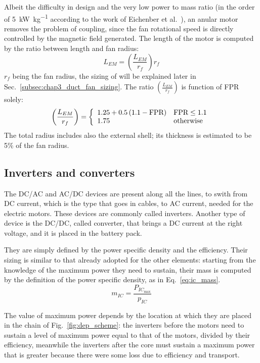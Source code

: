 Albeit the difficulty in design and the very low power to mass ratio (in the order of 5~\si{\kilo\watt\per\kilogram} according to the work of Eichenber et al.~\cite{bib:eichenber}), an anular motor removes the problem of coupling, since the fan rotational speed is directly controlled by the magnetic field generated. 
The length of the motor is computed by the ratio between length and fan radius:
\begin{equation}
	\label{eq:motor_length}
	L_{EM} = \left(\frac{L_{EM}}{r_{f}}\right)r_{f}
\end{equation}
$r_{f}$ being the fan radius, the sizing of will be explained later in Sec.~\ref{subsec:chap3_duct_fan_sizing}. 
The ratio $\left(\frac{L_{EM}}{r_{f}}\right)$ is function of FPR solely:
\begin{equation}
	\label{eq:motor_length_radius_ratio}
	\left(\frac{L_{EM}}{r_{f}}\right) = \left\{\begin{array}{l l}
		1.25 + 0.5\left(1.1-\textrm{FPR}\right) & \textrm{FPR}\leq 1.1 \\
		1.75 & \textrm{otherwise}
	\end{array}\right.	
\end{equation}
The total radius includes also the external shell; its thickness is estimated to be 5\% of the fan radius. 

\subsection{Inverters and converters}
\label{subsec:chap3_ic_model}

The DC/AC and AC/DC devices are present along all the lines, to swith from DC current, which is the type that goes in cables, to AC current, needed for the electric motors. 
These devices are commonly called inverters. 
Another type of device is the DC/DC, called converter, that brings a DC current at the right voltage, and it is placed in the battery pack. 

They are simply defined by the power specific density and the efficiency.
Their sizing is similar to that already adopted for the other elements: starting from the knowledge of the maximum power they need to sustain, their mass is computed by the definition of the power specific density, as in Eq.~\eqref{eq:ic_mass}.
\begin{equation}
\label{eq:ic_mass}
m_{IC} = \frac{P_{{IC}_{\max}}}{p_{IC}}
\end{equation}

The value of maximum power depends by the location at which they are placed in the chain of Fig.~\ref{fig:dep_scheme}: the inverters before the motors need to sustain a level of maximum power equal to that of the motors, divided by their efficiency, meanwhile the inverters after the core must sustain a maximum power that is greater because there were some loss due to efficiency and transport. 

